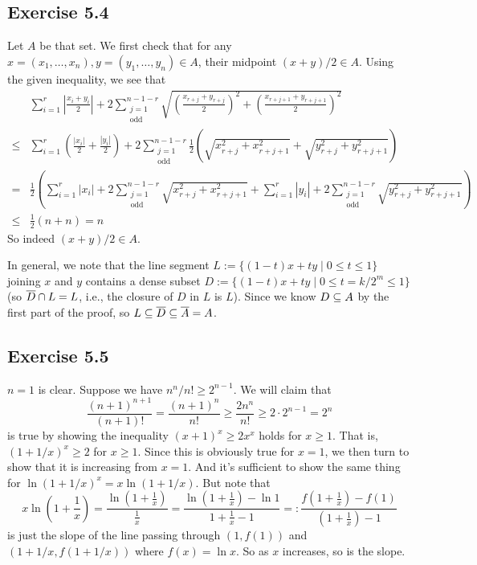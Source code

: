 \documentclass[../Marcus.tex]{subfiles}
\begin{document}
\subsection*{Exercise 5.4}

Let $A$ be that set. We first check that for any $x=(x_1,\ldots,x_n),y=(y_1,\ldots,y_n) \in A$, their midpoint $(x+y)/2\in A$. Using the given inequality, we see that
\begin{align*}
&\sum_{i=1}^r \left| \frac{x_i+y_i}{2} \right| + 2\sum_{\substack{j=1 \\ \text{odd} }}^{n-1-r} \sqrt{ \left( \frac{x_{r+j}+y_{r+j}}{2} \right)^2 + \left( \frac{x_{r+j+1}+y_{r+j+1}}{2} \right)^2 }       \\
\leq{} &\sum_{i=1}^r \left( \frac{ |x_i| }{2} + \frac{ |y_i| }{2} \right)
+ 2\sum_{\substack{j=1 \\ \text{odd} }}^{n-1-r} \frac{1}{2} \left( \sqrt{x_{r+j}^2+x_{r+j+1}^2} +  \sqrt{y_{r+j}^2+y_{r+j+1}^2} \right)      \\
={} &\frac{1}{2} \left( \sum_{i=1}^r |x_i|
+ 2\sum_{\substack{j=1 \\ \text{odd} }}^{n-1-r}  \sqrt{x_{r+j}^2+x_{r+j+1}^2} 
+ \sum_{i=1}^r |y_i| 
+ 2\sum_{\substack{j=1 \\ \text{odd} }}^{n-1-r} \sqrt{y_{r+j}^2+y_{r+j+1}^2}   \right)   \\
\leq{} &\frac{1}{2}(n+n) = n
\end{align*}
So indeed $(x+y)/2 \in A$.

In general, we note that the line segment $L := \{(1-t)x+ty \mid 0\leq t \leq 1\}$ joining $x$ and $y$ contains a dense subset $D := \{(1-t)x+ty \mid 0 \leq t = k/2^m \leq 1\}$ (so $\overline{D} \cap L = L$, i.e., the closure of $D$ in $L$ is $L$). Since we know $D \subseteq A$ by the first part of the proof, so $L \subseteq \overline{D} \subseteq \overline{A} = A$.

\subsection*{Exercise 5.5}

$n=1$ is clear. Suppose we have $n^n/n! \geq 2^{n-1}$. We will claim that
$$
\frac{(n+1)^{n+1}}{(n+1)!} = \frac{(n+1)^n}{n!} \geq \frac{2n^n}{n!} \geq 2 \cdot 2^{n-1} = 2^n
$$
is true by showing the inequality $(x+1)^x \geq 2x^x$ holds for $x\geq 1$. That is, $(1+1/x)^x \geq 2$ for $x\geq 1$. Since this is obviously true for $x=1$, we then turn to show that it is increasing from $x=1$. And it's sufficient to show the same thing for $\ln(1+1/x)^x = x\ln(1+1/x)$. But note that
$$
x\ln\left(1+\frac{1}{x}\right)
= \frac{ \ln(1+\frac{1}{x}) }{ \frac{1}{x} }
= \frac{ \ln(1+\frac{1}{x}) -\ln1}{ 1+ \frac{1}{x} -1}
=: \frac{ f(1+\frac{1}{x}) -f(1)}{ (1+ \frac{1}{x}) -1}
$$
is just the slope of the line passing through $(1,f(1))$ and $(1+1/x,f(1+1/x))$ where $f(x)=\ln x$. So as $x$ increases, so is the slope.
\end{document}
